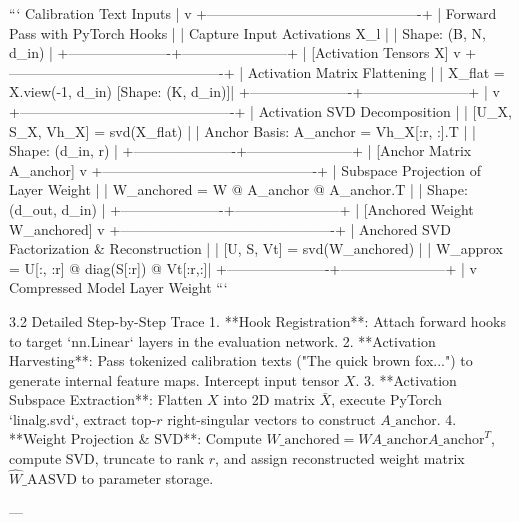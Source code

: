```
              Calibration Text Inputs
                         |
                         v
  +----------------------------------------------+
  | Forward Pass with PyTorch Hooks              |
  |   Capture Input Activations X\_l              |
  |   Shape: (B, N, d\_in)                        |
  +----------------------+-----------------------+
                         |  [Activation Tensors X]
                         v
  +----------------------------------------------+
  | Activation Matrix Flattening                 |
  |   X\_flat = X.view(-1, d\_in)  [Shape: (K, d\_in)]|
  +----------------------+-----------------------+
                         |
                         v
  +----------------------------------------------+
  | Activation SVD Decomposition                 |
  |   [U\_X, S\_X, Vh\_X] = svd(X\_flat)             |
  |   Anchor Basis: A\_anchor = Vh\_X[:r, :].T     |
  |   Shape: (d\_in, r)                           |
  +----------------------+-----------------------+
                         |  [Anchor Matrix A\_anchor]
                         v
  +----------------------------------------------+
  | Subspace Projection of Layer Weight          |
  |   W\_anchored = W @ A\_anchor @ A\_anchor.T     |
  |   Shape: (d\_out, d\_in)                       |
  +----------------------+-----------------------+
                         |  [Anchored Weight W\_anchored]
                         v
  +----------------------------------------------+
  | Anchored SVD Factorization \& Reconstruction  |
  |   [U, S, Vt] = svd(W\_anchored)               |
  |   W\_approx = U[:, :r] @ diag(S[:r]) @ Vt[:r,:]|
  +----------------------+-----------------------+
                         |
                         v
              Compressed Model Layer Weight
```

 3.2 Detailed Step-by-Step Trace
1. **Hook Registration**: Attach forward hooks to target `nn.Linear` layers in the evaluation network.
2. **Activation Harvesting**: Pass tokenized calibration texts ("The quick brown fox...") to generate internal feature maps. Intercept input tensor $X$.
3. **Activation Subspace Extraction**: Flatten $X$ into 2D matrix $\bar{X}$, execute PyTorch `linalg.svd`, extract top-$r$ right-singular vectors to construct $A\_{\text{anchor}}$.
4. **Weight Projection \& SVD**: Compute $W\_{\text{anchored}} = W A\_{\text{anchor}} A\_{\text{anchor}}^T$, compute SVD, truncate to rank $r$, and assign reconstructed weight matrix $\hat{W}\_{\text{AASVD}}$ to parameter storage.

---


